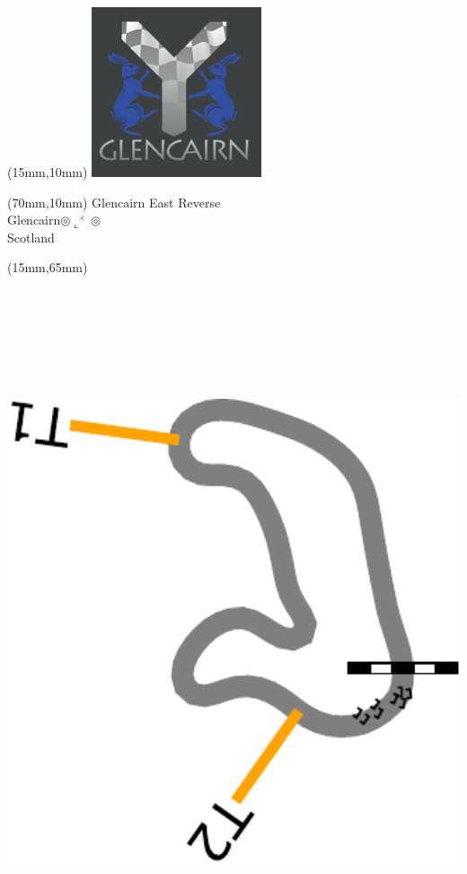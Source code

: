 \null\newpage
\begin{textblock*}{50mm}(15mm,10mm)%
\includegraphics[width=50mm]{LG/GLCN.png}
\end{textblock*}
\begin{textblock*}{130mm}(70mm,10mm)%
{\fontsize{20}{20}\selectfont Glencairn East Reverse\\}
{\fontsize{16}{16}\selectfont Glencairn\hfill $\circledcirc\llcorner^{\rightthreetimes}\circledcirc$\\}
{\fontsize{12}{12}\selectfont Scotland\\}
\end{textblock*}
\begin{textblock*}{185mm}(15mm,65mm)%
\centering
\mbox{\includegraphics[width=185mm,height=210mm,keepaspectratio]{PT/GLCNER.pdf}}
\end{textblock*}
